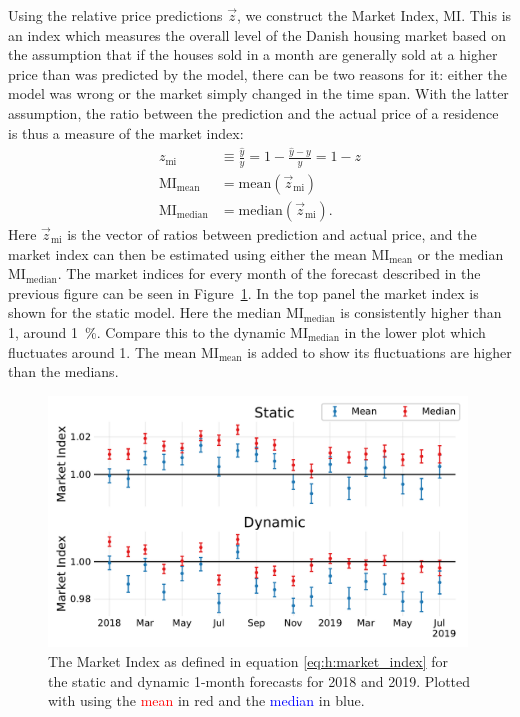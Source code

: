 Using the relative price predictions $\vec{z}$, we construct the Market Index, $\mathrm{MI}$. This is an index which measures the overall level of the Danish housing market based on the assumption that if the houses sold in a month are generally sold at a higher price than was predicted by the model, there can be two reasons for it: either the model was wrong or the market simply changed in the time span. With the latter assumption, the ratio between the prediction and the actual price of a residence is thus a measure of the market index:
\begin{equation}
  \begin{split}
    z_\mathrm{mi} &\equiv \frac{\hat{y}}{y} = 1 - \frac{\hat{y}-y}{y}  = 1-z \\
    \mathrm{MI}_\mathrm{mean} &= \mathrm{mean}(\vec{z}_\mathrm{mi}) \\
    \mathrm{MI}_\mathrm{median} &= \mathrm{median}(\vec{z}_\mathrm{mi}).
    \label{eq:h:market_index}
  \end{split}
\end{equation}
Here $\vec{z}_\mathrm{mi}$ is the vector of ratios between prediction and actual price, and the market index can then be estimated using either the mean $\mathrm{MI}_\mathrm{mean}$ or the median $\mathrm{MI}_\mathrm{median}$. The market indices for every month of the forecast described in the previous figure can be seen in Figure~\ref{fig:h:forecast_MarketIndex}. In the top panel the market index is shown for the static model. Here the median $\mathrm{MI}_\mathrm{median}$  is consistently higher than \num{1}, around \SI{1}{\percent}. Compare this to the dynamic $\mathrm{MI}_\mathrm{median}$ in the lower plot which fluctuates around \num{1}. The mean $\mathrm{MI}_\mathrm{mean}$ is added to show its fluctuations are higher than the medians. 
\begin{figure}
  \centerfloat
  \includegraphics[width=0.99\textwidth, trim=10 15 10 10, clip]{figures/housing/Ejerlejlighed_v19_cut_all_Ncols_all_xgb_forecast_prediction_MarketIndex.pdf}
  \caption[Market Index based on the Static and Dynamic XGB Forecasts]
          {The Market Index as defined in equation \eqref{eq:h:market_index} for the static and dynamic 1-month forecasts for \num{2018} and \num{2019}. Plotted with using the \textcolor{red}{mean} in red and the \textcolor{blue}{median} in blue.} 
  \label{fig:h:forecast_MarketIndex}
\end{figure}

